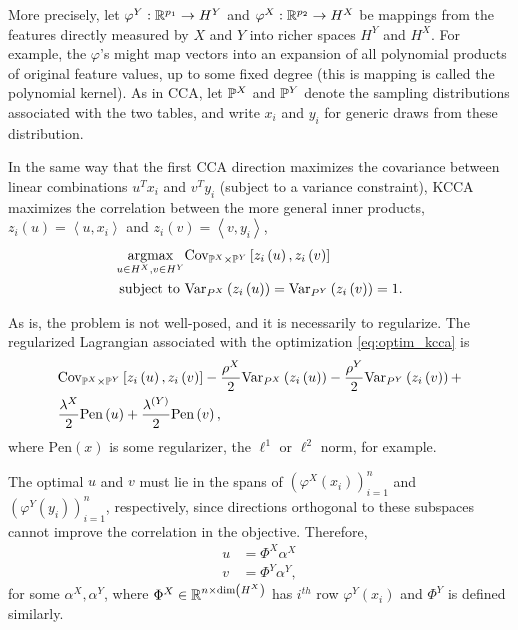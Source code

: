 \documentclass[14pt]{extarticle}
\begin{document}
More precisely, let $\varphi^{Y}: \reals^{p_{1}} \to H^{Y}$ and $\varphi^{X}:
\reals^{p_{2}} \to H^{X}$ be mappings from the features directly measured by $X$
and $Y$ into richer spaces $H^{Y}$ and $H^{X}$. For example, the $\varphi$'s
might map vectors into an expansion of all polynomial products of original
feature values, up to some fixed degree (this is mapping is called the
polynomial kernel). As in CCA, let $\P^{X}$ and $\P^{Y}$ denote the sampling
distributions associated with the two tables, and write $x_{i}$ and $y_{i}$ for
generic draws from these distribution.

In the same way that the first CCA direction maximizes the covariance between
linear combinations $u^{T}x_{i}$ and $v^{T}y_{i}$ (subject to a variance
constraint), KCCA maximizes the correlation between the more general inner
products, $z_{i}\left(u\right) = \left<u, x_{i}\right>$ and $z_{i}\left(v\right)
= \left<v, y_{i}\right>$,
\begin{align}
  \argmax_{u \in H^{X}, v \in H^{Y}}
  &\Covsubarg{\P^{X} \times \P^{Y}}{z_{i}\left(u\right), z_{i}\left(v\right)} \label{eq:optim_kcca}\\
\text{subject to } &\Varsubarg{P^{X}}{z_{i}\left(u\right)} = \Varsubarg{P^{Y}}{z_{i}\left(v\right)} = 1. \nonumber
\end{align}

As is, the problem is not well-posed, and it is necessarily to regularize. The
regularized Lagrangian associated with the optimization \ref{eq:optim_kcca} is
\begin{align}
  &\Covsubarg{\P^{X} \times \P^{Y}}{z_{i}\left(u\right), z_{i}\left(v\right)} -
  \frac{\rho^{X}}{2}\Varsubarg{P^{X}}{z_{i}\left(u\right)} -
  \frac{\rho^{Y}}{2}\Varsubarg{P^{Y}}{z_{i}\left(v\right)} + \label{eq:lagrangian_kcca}\\
  &\frac{\lambda^{X}}{2}\text{Pen}\left(u\right) + \frac{\lambda^{(Y)}}{2}\text{Pen}\left(v\right), \nonumber
\end{align}
where $\text{Pen}\left(x\right)$ is some regularizer, the $\ell^{1}$ or
$\ell^{2}$ norm, for example.

The optimal $u$ and $v$ must lie in the spans of
$\left(\varphi^{X}\left(x_{i}\right)\right)_{i =1 }^{n}$ and
$\left(\varphi^{Y}\left(y_{i}\right)\right)_{i =1 }^{n}$, respectively, since
directions orthogonal to these subspaces cannot improve the correlation in the
objective. Therefore,
\begin{align*}
u &= \Phi^{X} \alpha^{X} \\
v &= \Phi^{Y} \alpha^{Y},
\end{align*}
for some $\alpha^{X}, \alpha^{Y}$, where $\Phi^{X} \in \reals^{n \times
  \text{dim}\left(H^{X}\right)}$ has $i^{th}$ row
$\varphi^{Y}\left(x_{i}\right)$ and $\Phi^{Y}$ is defined similarly.
\end{document}
